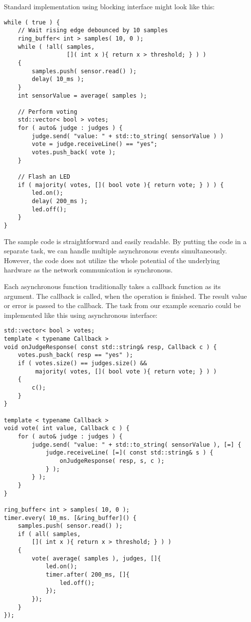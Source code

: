 Standard implementation using blocking interface might look like this:
\begin{verbatim}
while ( true ) {
    // Wait rising edge debounced by 10 samples
    ring_buffer< int > samples( 10, 0 );
    while ( !all( samples,
                  []( int x ){ return x > threshold; } ) )
    {
        samples.push( sensor.read() );
        delay( 10_ms );
    }
    int sensorValue = average( samples );

    // Perform voting
    std::vector< bool > votes;
    for ( auto& judge : judges ) {
        judge.send( "value: " + std::to_string( sensorValue ) )
        vote = judge.receiveLine() == "yes";
        votes.push_back( vote );
    }

    // Flash an LED
    if ( majority( votes, []( bool vote ){ return vote; } ) ) {
        led.on();
        delay( 200_ms );
        led.off();
    }
}
\end{verbatim}

The sample code is straightforward and easily readable. By putting the code in a
separate task, we can handle multiple asynchronous events simultaneously.
However, the code does not utilize the whole potential of the underlying
hardware as the network communication is synchronous.

Each asynchronous function traditionally takes a callback function as its
argument. The callback is called, when the operation is finished. The result
value or error is passed to the callback. The task from our example scenario
could be implemented like this using asynchronous interface:

\begin{verbatim}
std::vector< bool > votes;
template < typename Callback >
void onJudgeResponse( const std::string& resp, Callback c ) {
    votes.push_back( resp == "yes" );
    if ( votes.size() == judges.size() &&
         majority( votes, []( bool vote ){ return vote; } ) )
    {
        c();
    }
}

template < typename Callback >
void vote( int value, Callback c ) {
    for ( auto& judge : judges ) {
        judge.send( "value: " + std::to_string( sensorValue ), [=] {
            judge.receiveLine( [=]( const std::string& s ) {
                onJudgeResponse( resp, s, c );
            } );
        } );
    }
}

ring_buffer< int > samples( 10, 0 );
timer.every( 10_ms. [&ring_buffer]() {
    samples.push( sensor.read() );
    if ( all( samples,
        []( int x ){ return x > threshold; } ) )
    {
        vote( average( samples ), judges, []{
            led.on();
            timer.after( 200_ms, []{
                led.off();
            });
        });
    }
});
\end{verbatim}

